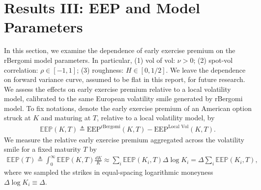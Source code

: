 \documentclass[12pt]{article}
\numberwithin{equation}{section}
\begin{document}
\section{Results III: EEP and Model Parameters}
In this section, we examine the dependence of early exercise premium on the rBergomi model parameters. In particular, (1) vol of vol: $\nu>0$; (2) spot-vol correlation: $\rho \in [-1,1]$; (3) roughness: $H \in [0,1/2]$. We leave the dependence on forward variance curve, assumed to be flat in this report, for future research. We assess the effects on early exercise premium relative to a local volatility model, calibrated to the same European volatility smile generated by rBergomi model. To fix notations, denote the early exercise premium of an American option struck at $K$ and maturing at $T$, relative to a local volatility model, by
\begin{align}
\mathbb{EEP}(K,T) \triangleq \text{EEP}^{\text{rBergomi}}(K,T) - \text{EEP}^{\text{Local Vol}}(K,T).
\end{align}
We measure the relative early exercise premium aggregated across the volatility smile for a fixed maturity $T$ by
\begin{align*}
\mathbb{EEP}(T) \triangleq \int_0^\infty \mathbb{EEP}(K,T) \frac{dK}{K} \approx \sum_{i} \mathbb{EEP}(K_i,T)\Delta \log K_i = \Delta \sum_{i} \mathbb{EEP}(K_i,T),
\end{align*}
where we sampled the strikes in equal-spacing logarithmic moneyness $\Delta \log K_i \equiv \Delta$.
\end{document}
